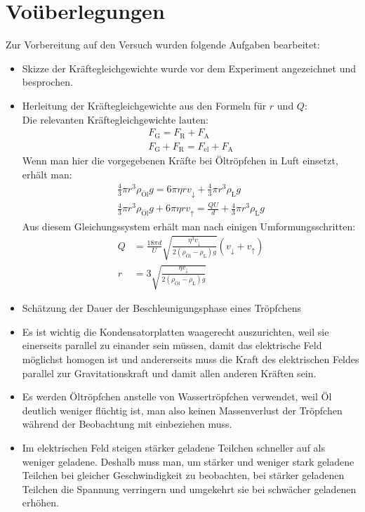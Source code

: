 \documentclass[
	a4paper,
	12pt,
	pagesize,
	ngerman
]{scrartcl}
\begin{document}
	\section{Voüberlegungen}
	Zur Vorbereitung auf den Versuch wurden folgende Aufgaben bearbeitet:
	\begin{itemize}
		\item Skizze der Kräftegleichgewichte wurde vor dem Experiment angezeichnet und besprochen.
		\item Herleitung der Kräftegleichgewichte aus den Formeln für $ r $ und $ Q $: \\
		Die relevanten Kräftegleichgewichte lauten:
		\begin{align*}
			F_\text{G}=F_\text{R}+F_\text{A}\\
			F_\text{G}+F_\text{R}=F_\text{el}+F_\text{A}
		\end{align*}
		Wenn man hier die vorgegebenen Kräfte bei Öltröpfchen in Luft einsetzt, erhält man:
		\begin{align*}
			\frac{4}{3}\pi r^3 \rho_\text{Öl} g = 6 \pi \eta r v_\downarrow + \frac{4}{3}\pi r^3 \rho_\text{L}g\\
			\frac{4}{3}\pi r^3 \rho_\text{Öl} g + 6 \pi \eta r v_\uparrow = \frac{QU}{d} + \frac{4}{3}\pi r^3 \rho_\text{L}g
		\end{align*}
		Aus diesem Gleichungssystem erhält man nach einigen Umformungsschritten:
		\begin{align*}
			Q&=\frac{18 \pi d}{U} \sqrt{\frac{\eta^3 v_\downarrow}{2(\rho_\text{Öl}-\rho_\text{L})g}}(v_\downarrow + v_\uparrow)\\
			r&=3\sqrt{\frac{\eta v_\downarrow}{2(\rho_\text{Öl}-\rho_\text{L})g}}
		\end{align*}
		\item Schätzung der Dauer der Beschleunigungsphase eines Tröpfchens %
		\item Es ist wichtig die Kondensatorplatten waagerecht auszurichten, weil sie einerseits parallel zu einander sein müssen, damit das elektrische Feld möglichst homogen ist und andererseits muss die Kraft des elektrischen Feldes parallel zur Gravitationskraft und damit allen anderen Kräften sein.
		\item Es werden Öltröpfchen anstelle von Wassertröpfchen verwendet, weil Öl deutlich weniger flüchtig ist, man also keinen Massenverlust der Tröpfchen während der Beobachtung mit einbeziehen muss.
		\item Im elektrischen Feld steigen stärker geladene Teilchen schneller auf als weniger geladene. Deshalb muss man, um stärker und weniger stark geladene Teilchen bei gleicher Geschwindigkeit zu beobachten, bei stärker geladenen Teilchen die Spannung verringern und umgekehrt sie bei schwächer geladenen erhöhen.

\end{itemize}
\end{document}
